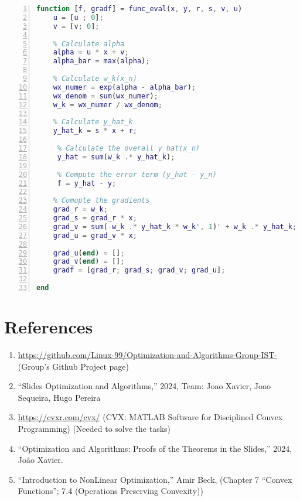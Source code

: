 \documentclass[a4paper,12pt]{report}
\begin{document}
\begin{lstlisting}[language=Matlab, style=Matlab-editor, frame=single, numbers=left]
function [f, gradf] = func_eval(x, y, r, s, v, u)
    u = [u ; 0];
    v = [v; 0];    

    % Calculate alpha
    alpha = u * x + v;
    alpha_bar = max(alpha);

    % Calculate w_k(x_n) 
    wx_numer = exp(alpha - alpha_bar);     
    wx_denom = sum(wx_numer);  
    w_k = wx_numer / wx_denom;

    % Calculate y_hat_k
    y_hat_k = s * x + r;

     % Calculate the overall y_hat(x_n)
     y_hat = sum(w_k .* y_hat_k);
        
     % Compute the error term (y_hat - y_n)
     f = y_hat - y;   
    
 	% Comupte the gradients
    grad_r = w_k;
    grad_s = grad_r * x;
    grad_v = sum(-w_k .* y_hat_k * w_k', 1)' + w_k .* y_hat_k;
    grad_u = grad_v * x;
    
    grad_u(end) = [];
    grad_v(end) = [];
    gradf = [grad_r; grad_s; grad_v; grad_u];
    
end

\end{lstlisting}



\newpage
{}
\section*{References}

\begin{enumerate}
    \item \url{https://github.com/Linux-99/Optimization-and-Algorithms-Group-IST-} (Group’s Github Project page)
    \item “Slides Optimization and Algorithms,” 2024, Team: Joao Xavier, Joao Sequeira, Hugo Pereira
    \item \url{https://cvxr.com/cvx/} (CVX: MATLAB Software for Disciplined Convex Programming) (Needed to solve the tasks)
    \item “Optimization and Algorithms: Proofs of the Theorems in the Slides,” 2024, João Xavier.
    \item “Introduction to NonLinear Optimization,” Amir Beck, (Chapter 7 “Convex Functions”; 7.4 (Operations Preserving Convexity))
\end{enumerate}

\appendix 
\end{document}
